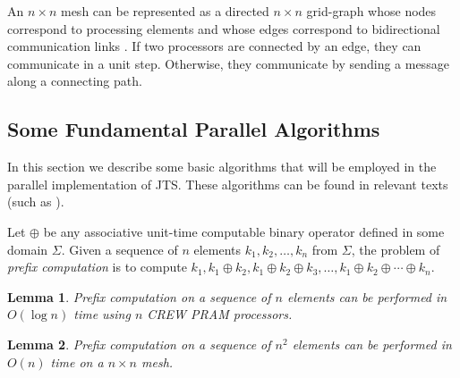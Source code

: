 \documentclass[10pt, conference, compsocconf]{IEEEtran}
\newtheorem{lemma}{Lemma}
\begin{document}

An $n \times n$ mesh can be represented as a directed $n\times n$ grid-graph whose nodes correspond to processing elements and whose edges correspond to bidirectional communication links \cite{leighton2014introduction,horowitz2008computer}.  If two processors are connected by an edge, they can communicate in a unit step. Otherwise, they communicate by sending a message along a connecting path.


\subsection{Some Fundamental Parallel Algorithms}
In this section we  describe some basic algorithms that will be employed in the parallel implementation of JTS. These algorithms can be found in relevant texts (such as \cite{horowitz2008computer,jaja1992introduction,leighton2014introduction}).

Let $\oplus$ be any associative unit-time computable binary operator defined in some domain $\Sigma$. Given a sequence of $n$ elements $k_1,k_2,\ldots,k_n$ from $\Sigma$, the problem of {\em prefix computation} is to compute $k_1,k_1\oplus k_2,k_1\oplus k_2\oplus k_3,\ldots,k_1\oplus k_2\oplus\cdots \oplus k_n$.

\begin{lemma}
\label{prefix1}
Prefix computation on a sequence of $n$ elements can be performed in
$O(\log n)$ time using $n$ CREW PRAM processors.
\end{lemma}

\begin{lemma}
\label{prefix2}
Prefix computation on a sequence of $n^2$ elements can be performed in
$O(n)$ time on a $n\times n$ mesh. 
\end{lemma}
\end{document}
